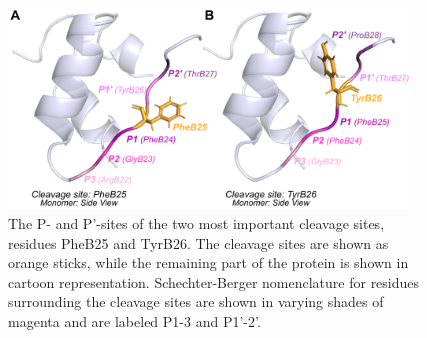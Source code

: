 \documentclass[sn-vancouver]{sn-jnl}
\begin{document}
\begin{figure}[H]
\centering
\includegraphics[width=0.95\textwidth]{Figures/P_sites.png}
\caption{The P- and P'-sites of the two most important cleavage sites, residues PheB25 and TyrB26. The cleavage sites are shown as  orange sticks, while the remaining part of the protein is shown in cartoon representation. Schechter-Berger nomenclature for residues surrounding the cleavage sites are shown in varying shades of magenta and are labeled P1-3 and P1'-2'.}
\label{P_sites}
\end{figure}
\end{document}
